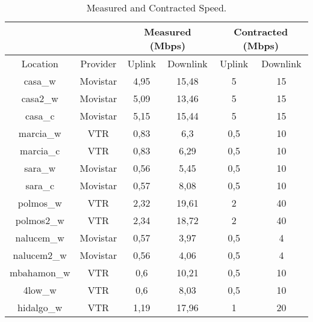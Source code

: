 \begin{table}[ht]
\begin{center}
\begin{tabular}{|c|c||c|c||c|c||}
\hline
&&\multicolumn{2}{|c||}{Measured (Mbps)} & \multicolumn{2}{|c||}{Contracted (Mbps)} \\ \hline	
Location	& Provider	& Uplink 	  	 & Downlink  &	Uplink	& Downlink \\ \hline \hline 
casa\_w		& Movistar	& 4,95			 & 15,48	 & 5		& 15 \\ \hline 
casa2\_w	& Movistar	& 5,09			 & 13,46	 & 5		& 15 \\ \hline 
casa\_c	 	& Movistar	& 5,15			 & 15,44	 & 5		& 15 \\ \hline 
marcia\_w	& VTR		& 0,83			 & 6,3 	 	 & 0,5		& 10 \\ \hline 
marcia\_c	& VTR		& 0,83			 & 6,29	 	 & 0,5		& 10 \\ \hline 
sara\_w		& Movistar	& 0,56			 & 5,45		 & 0,5		& 10 \\ \hline 
sara\_c		& Movistar	& 0,57			 & 8,08		 & 0,5		& 10 \\ \hline 
polmos\_w	& VTR		& 2,32			 & 19,61	 & 2		& 40 \\ \hline 
polmos2\_w	& VTR		& 2,34			 & 18,72	 & 2		& 40 \\ \hline 
nalucem\_w	& Movistar	& 0,57			 & 3,97	 	 & 0,5		& 4 \\ \hline
nalucem2\_w	& Movistar	& 0,56			 & 4,06		 & 0,5		& 4 \\ \hline
mbahamon\_w	& VTR		& 0,6 			 & 10,21	 & 0,5		& 10 \\ \hline
4low\_w		& VTR		& 0,6			 & 8,03		 & 0,5		& 10 \\ \hline
hidalgo\_w	& VTR		& 1,19			 & 17,96	 & 1		& 20 \\ \hline
\end{tabular}
\end{center}
\caption[Speed Test: Measured and Contracted Speed ]{Measured and Contracted Speed.}
\label{table:comparative}
\end{table}
